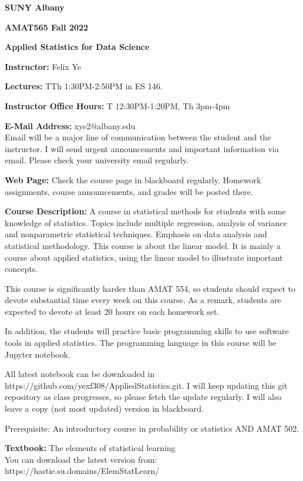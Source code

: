 \documentclass[a4paper,10pt]{article}
\begin{document}
\begin{center}

\textbf{SUNY Albany}

\textbf{AMAT565 Fall 2022}

\textbf{Applied Statistics for Data Science}


\end{center}

\textbf{Instructor:} Felix Ye 

\textbf{Lectures:} TTh 1:30PM-2:50PM  in ES 146.

\textbf{Instructor Office Hours:}  T 12:30PM-1:20PM, Th 3pm-4pm


\textbf{E-Mail Address:} xye2@albany.edu\\
Email will be a major line of communication between the student and the instructor. I will send urgent announcements and important information via email. Please check your university email regularly.

\textbf{Web Page:}
Check the course page in blackboard regularly. Homework assignments, course announcements, and grades will be posted there.


\textbf{Course Description:} 	
A course in statistical methods for students with some knowledge of statistics. Topics include multiple regression, analysis of variance and nonparametric statistical techniques. Emphasis on data analysis and statistical methodology.  
This course is about the linear model. It is mainly a course about applied statistics, using the linear model to illustrate important concepts.

This course is significantly harder than AMAT 554, so students should expect to devote substantial time every week on this course. As a remark, students are expected to devote at least 20 hours on each homework set. 

In addition, the students will practice basic programming skills to use software tools in applied statistics. The programming language in this course will be Jupyter notebook. 

All latest notebook can be downloaded in https://github.com/yexf308/AppliedStatistics.git. I will keep updating this git repository as class progresses, so please fetch the update regularly. I will also leave a copy (not most updated) version in blackboard. 

 Prerequisite: An introductory course in probability or statistics AND AMAT 502.
 

\textbf{Textbook:} 
The elements of statistical learning \\
You can download the latest version from: https://hastie.su.domains/ElemStatLearn/
\end{document}
